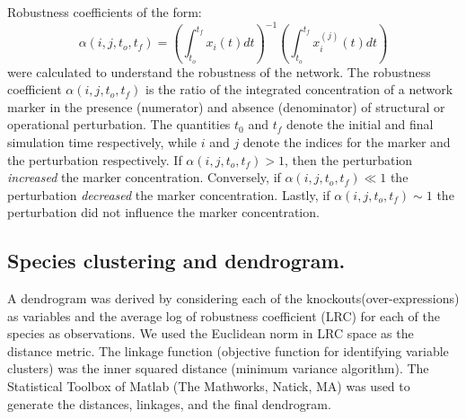 \documentclass[fleqn,10pt]{wlscirep}
\begin{document}
Robustness coefficients of the form:
\begin{equation}
\alpha\left(i,j,t_{o},t_{f}\right)=\left(\displaystyle\int_{t_{o}}^{t_{f}}x_{i}\left(t\right)dt\right)^{-1}\left(\displaystyle\int_{t_{o}}^{t_{f}}x^{(j)}_{i}\left(t\right)dt\right)
\end{equation}
were calculated to understand the robustness of the network.
The robustness coefficient $\alpha\left(i,j,t_{o},t_{f}\right)$ is the ratio of the integrated concentration of a network marker
in the presence (numerator) and absence (denominator) of structural or operational perturbation.
The quantities $t_0$ and $t_f$ denote the initial and final simulation time respectively, while
$i$ and $j$ denote the indices for the marker and the perturbation respectively.
If $\alpha\left(i,j,t_{o},t_{f}\right)>1$, then the perturbation \emph{increased} the marker concentration. Conversely,
if $\alpha\left(i,j,t_{o},t_{f}\right)\ll{1}$ the perturbation \emph{decreased} the marker concentration. Lastly, if
$\alpha\left(i,j,t_{o},t_{f}\right)\sim{1}$ the perturbation did not influence the marker concentration.

\subsection*{Species clustering and dendrogram.}
A dendrogram was derived by considering each of the knockouts(over-expressions) as variables and the average log of robustness coefficient (LRC) for each of the species as observations.
We used the Euclidean norm in LRC space as the distance metric. The linkage function (objective function for identifying variable clusters) was the inner squared distance (minimum variance algorithm).
The Statistical Toolbox of Matlab (The Mathworks, Natick, MA) was used to generate the distances, linkages, and the final dendrogram.
\end{document}
